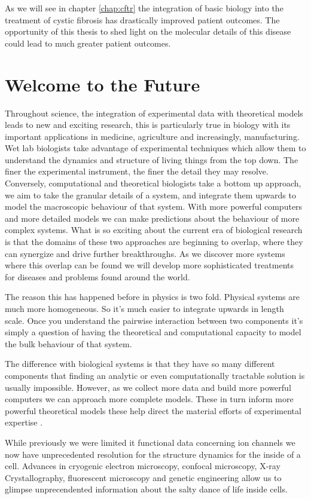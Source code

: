 As we will see in chapter \ref{chap:cftr} the integration of basic biology into the treatment of cystic fibrosis has drastically improved patient outcomes. The opportunity of this thesis to shed light on the molecular details of this disease could lead to much greater patient outcomes. 

\section{Welcome to the Future}
Throughout science, the integration of experimental data with theoretical models leads to new and exciting research, this is particularly true in biology with its important applications in medicine, agriculture and increasingly, manufacturing. Wet lab biologists take advantage of experimental techniques which allow them to understand the dynamics and structure of living things from the top down. The finer the experimental instrument, the finer the detail they may resolve. Conversely, computational and theoretical biologists take a bottom up approach, we aim to take the granular details of a system, and integrate them upwards to model the macroscopic behaviour of that system. With more powerful computers and more detailed models we can make predictions about the behaviour of more complex systems. What is so exciting about the current era of biological research is that the domains of these two approaches are beginning to overlap, where they can synergize  and drive further breakthroughs. As we discover more systems where this overlap can be found we will develop more sophisticated treatments for diseases and problems found around the world.

The reason this has happened before in physics is two fold. Physical systems are much more homogeneous. So it's much easier to integrate upwards in length scale. Once you understand the pairwise interaction between two components it's simply a question of having the theoretical and computational capacity to model the bulk behaviour of that system. 

The difference with biological systems is that they have so many different components that finding an analytic or even computationally tractable solution is usually impossible. However, as we collect more data and build more powerful computers we can approach more complete models. These in turn inform more powerful theoretical models these help direct the material efforts of experimental expertise . 

While previously we were limited it functional data concerning ion channels we now have unprecedented resolution for the structure dynamics for the inside of a cell. Advances in cryogenic electron microscopy, confocal microscopy, X-ray Crystallography, fluorescent microscopy and genetic engineering allow us to glimpse unprecendented information about the salty dance of life inside cells.

